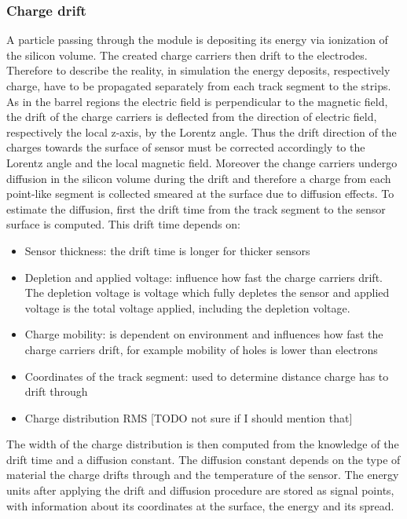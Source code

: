 \subsubsection{Charge drift}

A particle passing through the module is depositing its energy via ionization of the silicon volume. The created charge carriers then drift to the electrodes. Therefore to describe the reality, in simulation the energy deposits, respectively charge, have to be propagated separately from each track segment to the strips. As in the barrel regions the electric field is perpendicular to the magnetic field, the drift of the charge carriers is deflected from the direction of electric field, respectively the local z-axis, by the Lorentz angle. Thus the drift direction of the charges towards the surface of sensor must be corrected accordingly to the Lorentz angle and the local magnetic field. Moreover the change carriers undergo diffusion in the silicon volume during the drift and therefore a charge from each point-like segment is collected smeared at the surface due to diffusion effects. To estimate the diffusion, first the drift time from the track segment to the sensor surface is computed. This drift time depends on:

\begin{itemize}
\item Sensor thickness: the drift time is longer for thicker sensors
\item Depletion and applied voltage: influence how fast the charge carriers drift. The depletion voltage is voltage which fully depletes the sensor and applied voltage is the total voltage applied, including the depletion voltage.
\item Charge mobility: is dependent on environment and influences how fast the charge carriers drift, for example mobility of holes is lower than electrons
\item Coordinates of the track segment: used to determine distance charge has to drift through
\item Charge distribution RMS [TODO not sure if I should mention that] %
\end{itemize}

The width of the charge distribution is then computed from the knowledge of the drift time and a diffusion constant. The diffusion constant depends on the type of material the charge drifts through and the temperature of the sensor. The energy units after applying the drift and diffusion procedure are stored as signal points, with information about its coordinates at the surface, the energy and its spread.

